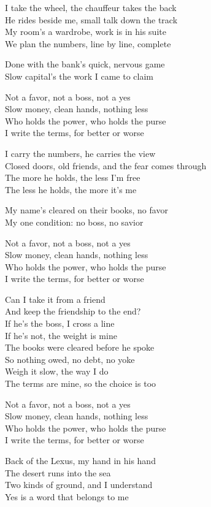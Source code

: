 \begin{lyrics}
I take the wheel, the chauffeur takes the back\\
He rides beside me, small talk down the track\\
My room's a wardrobe, work is in his suite\\
We plan the numbers, line by line, complete

Done with the bank's quick, nervous game\\
Slow capital's the work I came to claim

Not a favor, not a boss, not a yes\\
Slow money, clean hands, nothing less\\
Who holds the power, who holds the purse\\
I write the terms, for better or worse

I carry the numbers, he carries the view\\
Closed doors, old friends, and the fear comes through\\
The more he holds, the less I'm free\\
The less he holds, the more it's me

My name's cleared on their books, no favor\\
My one condition: no boss, no savior

Not a favor, not a boss, not a yes\\
Slow money, clean hands, nothing less\\
Who holds the power, who holds the purse\\
I write the terms, for better or worse

Can I take it from a friend\\
And keep the friendship to the end?\\
If he's the boss, I cross a line\\
If he's not, the weight is mine\\
The books were cleared before he spoke\\
So nothing owed, no debt, no yoke\\
Weigh it slow, the way I do\\
The terms are mine, so the choice is too

Not a favor, not a boss, not a yes\\
Slow money, clean hands, nothing less\\
Who holds the power, who holds the purse\\
I write the terms, for better or worse

Back of the Lexus, my hand in his hand\\
The desert runs into the sea\\
Two kinds of ground, and I understand\\
Yes is a word that belongs to me
\end{lyrics}

